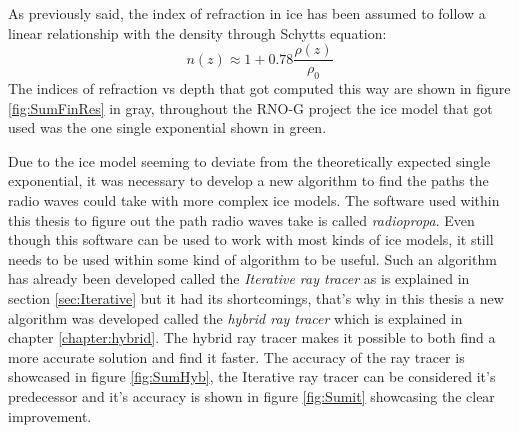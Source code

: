 As previously said, the index of refraction in ice has been assumed to follow a linear relationship with 
the density through Schytts equation:
\begin{equation*}
  n(z) \approx 1 + 0.78\frac{\rho(z)}{\rho_0}
\end{equation*}
The indices of refraction vs depth that got computed this way are shown in figure \ref{fig:SumFinRes}
in gray, throughout the RNO-G project the ice model that got used was the one single exponential shown in 
green.

Due to the ice model seeming to deviate from the theoretically expected single
exponential, it was necessary to develop a new algorithm to find the paths the
radio waves could take with more complex ice models.  The software used within
this thesis to figure out the path radio waves take is called
\textit{radiopropa}.  Even though this software can be used to work with most
kinds of ice models, it still needs to be used within some kind of algorithm to
be useful. Such an algorithm has already been developed called the
\textit{Iterative ray tracer} as is explained in section \ref{sec:Iterative}
but it had its shortcomings, that's why in this thesis a new algorithm was
developed called the \textit{hybrid ray tracer} which is explained in chapter
\ref{chapter:hybrid}. The hybrid ray tracer makes it possible to both find a
more accurate solution and find it faster. The accuracy of the ray tracer
is showcased in figure \ref{fig:SumHyb}, the Iterative ray tracer can
be considered it's predecessor and it's accuracy is shown in figure \ref{fig:Sumit}
showcasing the clear improvement.

